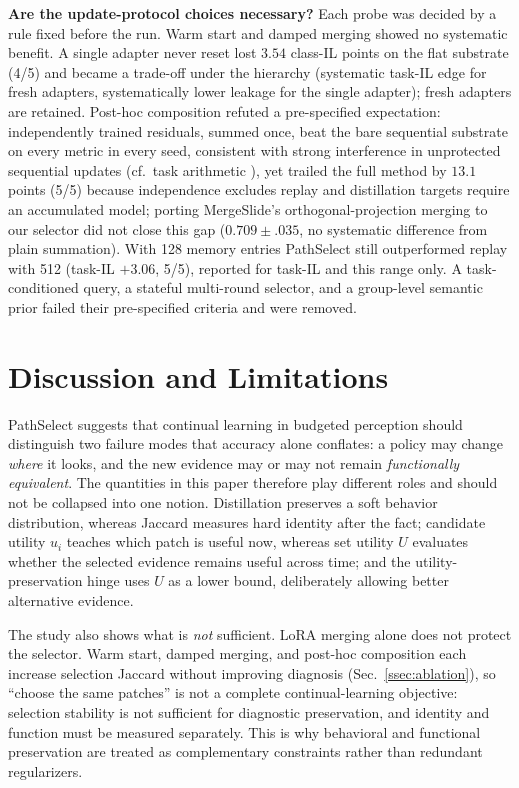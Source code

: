 \documentclass{article}
\begin{document}
\textbf{Are the update-protocol choices necessary?}
Each probe was decided by a rule fixed before the run. Warm start and damped merging showed no systematic benefit. A single adapter never reset lost $3.54$ class-IL points on the flat substrate (4/5) and became a trade-off under the hierarchy (systematic task-IL edge for fresh adapters, systematically lower leakage for the single adapter); fresh adapters are retained. Post-hoc composition refuted a pre-specified expectation: independently trained residuals, summed once, beat the bare sequential substrate on every metric in every seed, consistent with strong interference in unprotected sequential updates (cf.\ task arithmetic \cite{ilharco2023task}), yet trailed the full method by $13.1$ points (5/5) because independence excludes replay and distillation targets require an accumulated model; porting MergeSlide's orthogonal-projection merging \cite{bui2026mergeslide} to our selector did not close this gap ($0.709{\pm}.035$, no systematic difference from plain summation). With 128 memory entries PathSelect still outperformed replay with 512 (task-IL $+3.06$, 5/5), reported for task-IL and this range only. A task-conditioned query, a stateful multi-round selector, and a group-level semantic prior failed their pre-specified criteria and were removed.

\FloatBarrier
\section{Discussion and Limitations}
\label{sec:discussion}

PathSelect suggests that continual learning in budgeted perception should distinguish two failure modes that accuracy alone conflates: a policy may change \emph{where} it looks, and the new evidence may or may not remain \emph{functionally equivalent}. The quantities in this paper therefore play different roles and should not be collapsed into one notion. Distillation preserves a soft behavior distribution, whereas Jaccard measures hard identity after the fact; candidate utility $u_i$ teaches which patch is useful now, whereas set utility $U$ evaluates whether the selected evidence remains useful across time; and the utility-preservation hinge uses $U$ as a lower bound, deliberately allowing better alternative evidence.

The study also shows what is \emph{not} sufficient. LoRA merging alone does not protect the selector. Warm start, damped merging, and post-hoc composition each increase selection Jaccard without improving diagnosis (Sec.~\ref{ssec:ablation}), so ``choose the same patches'' is not a complete continual-learning objective: selection stability is not sufficient for diagnostic preservation, and identity and function must be measured separately. This is why behavioral and functional preservation are treated as complementary constraints rather than redundant regularizers.
\end{document}
